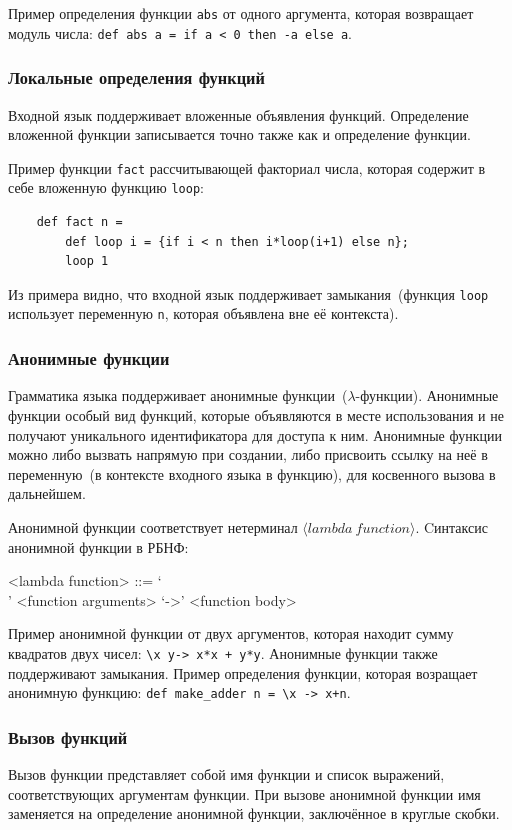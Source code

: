 \documentclass[12pt,a4paper,oneside]{extarticle}
\begin{document}
            Пример определения функции \lstinline$abs$ от одного аргумента, которая возвращает модуль числа: \lstinline$def abs a = if a < 0 then -a else a$.
        \subsubsection{Локальные определения функций}
            Входной язык поддерживает вложенные объявления функций.
            Определение вложенной функции записывается точно также как и определение функции. 

            Пример функции \lstinline$fact$ рассчитывающей факториал числа, которая содержит в себе вложенную функцию \lstinline$loop$:
            \begin{lstlisting}
    def fact n = 
        def loop i = {if i < n then i*loop(i+1) else n};
        loop 1
            \end{lstlisting}
            Из примера видно, что входной язык поддерживает замыкания~(функция \lstinline$loop$ использует переменную \lstinline$n$, которая объявлена вне её контекста).

        \subsubsection{Анонимные функции}
            Грамматика языка поддерживает анонимные функции~($\lambda$-функции). Анонимные функции особый вид функций, которые объявляются в месте использования и не получают уникального идентификатора для доступа к ним. Анонимные функции можно либо вызвать напрямую при создании, либо присвоить ссылку на неё в переменную~(в контексте входного языка в функцию), для косвенного вызова в дальнейшем.

            Анонимной функции соответствует нетерминал $\langle lambda~function \rangle$. Cинтаксис анонимной функции в РБНФ:
            \begin{grammar}
                <lambda function> ::= `\\' <function arguments> `->' <function body>
            \end{grammar}

            Пример анонимной функции от двух аргументов, которая находит сумму квадратов двух чисел: \lstinline$\x y-> x*x + y*y$. 
            Анонимные функции также поддерживают замыкания. Пример определения функции, которая возращает анонимную функцию: \lstinline$def make_adder n = \x -> x+n$.

        \subsubsection{Вызов функций}
            Вызов функции представляет собой имя функции и список выражений, соответствующих аргументам функции.
            При вызове анонимной функции имя заменяется на определение анонимной функции, заключённое в круглые скобки.
\end{document}
